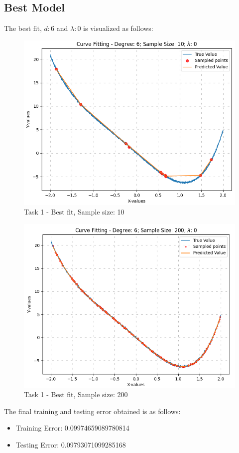 \documentclass[12pt,a4paper]{article}
\newcommand{\noi}{\noindent}
\begin{document}
\subsection{Best Model}
The best fit, $d:6$ and $\lambda:0$ is visualized as follows:
\begin{figure}[H]
    \centering
    \includegraphics[scale=0.5]{images/d_6_size_10_l_0.png}
    \caption{Task 1 - Best fit, Sample size: 10}
\end{figure}
\begin{figure}[H]
    \centering
    \includegraphics[scale=0.5]{images/d_6_size_200_l_0.png}
    \caption{Task 1 - Best fit, Sample size: 200}
\end{figure}
\noi
The final training and testing error obtained is as follows:
\begin{itemize}
    \itemsep0em
    \item Training Error: 0.09974659089780814
    \item Testing Error: 0.09793071099285168
\end{itemize}
\end{document}
